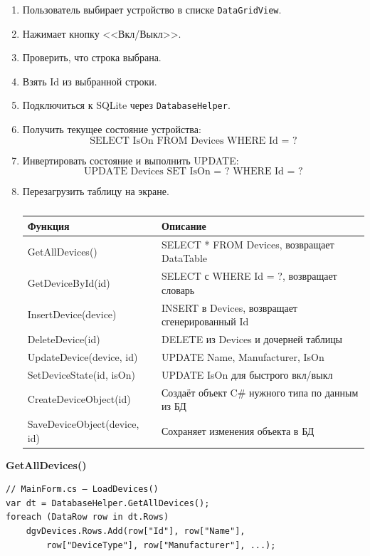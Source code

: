 \documentclass[oneside,a4paper,14pt]{extarticle}
\begin{document}
\begin{enumerate}
    \item Пользователь выбирает устройство в списке \texttt{DataGridView}.
    \item Нажимает кнопку <<Вкл/Выкл>>.
    \item Проверить, что строка выбрана.
    \item Взять Id из выбранной строки.
    \item Подключиться к SQLite через \texttt{DatabaseHelper}.
    \item Получить текущее состояние устройства:
    \[
    \text{SELECT IsOn FROM Devices WHERE Id = ?}
    \]
    \item Инвертировать состояние и выполнить UPDATE:
    \[
    \text{UPDATE Devices SET IsOn = ? WHERE Id = ?}
    \]
    \item Перезагрузить таблицу на экране.
\newpage
    \begin{table}[h!]
\centering
\begin{tabular}{|l|p{10cm}|}
\hline
\textbf{Функция} & \textbf{Описание} \\
\hline
GetAllDevices() & SELECT * FROM Devices, возвращает DataTable \\
\hline
GetDeviceById(id) & SELECT с WHERE Id = ?, возвращает словарь \\
\hline
InsertDevice(device) & INSERT в Devices, возвращает сгенерированный Id \\
\hline
DeleteDevice(id) & DELETE из Devices и дочерней таблицы \\
\hline
UpdateDevice(device, id) & UPDATE Name, Manufacturer, IsOn \\
\hline
SetDeviceState(id, isOn) & UPDATE IsOn для быстрого вкл/выкл \\
\hline
CreateDeviceObject(id) & Создаёт объект C# нужного типа по данным из БД \\
\hline
SaveDeviceObject(device, id) & Сохраняет изменения объекта в БД \\
\hline
\end{tabular}
\caption*{}
\label{tab:db_methods}
\end{table}
\end{enumerate}

\textbf{GetAllDevices()}

\begin{verbatim}
// MainForm.cs — LoadDevices()
var dt = DatabaseHelper.GetAllDevices();
foreach (DataRow row in dt.Rows)
    dgvDevices.Rows.Add(row["Id"], row["Name"],
        row["DeviceType"], row["Manufacturer"], ...);
\end{verbatim}
\end{document}
